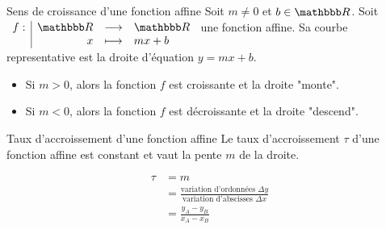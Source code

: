 \documentclass[10pt,a4paper,openany,twoside, eleve]{book}
\begin{document}
\begin{prop}{Sens de croissance d'une fonction affine}{}
  Soit $m \ne 0$ et $b\in\R$. Soit $\fonction{f}{\R}{\R}{x}{mx+b}$ une fonction affine. Sa courbe representative est la droite d'équation $y=mx+b$.

  \begin{itemize}
    \item Si $m>0$, alors la fonction $f$ est croissante et la droite "monte".
    \item Si $m<0$, alors la fonction $f$ est décroissante et la droite "descend".
  \end{itemize}
\end{prop}

\begin{prop}{Taux d'accroissement d'une fonction affine}{}
  Le taux d'accroissement $\tau$ d'une fonction affine est constant et vaut la pente $m$ de la droite.

  \begin{minipage}[t]{.5\textwidth}
    \vspace{-4.5cm}
    \begin{align*}
      \tau & = m                                                                                  \\
           & =\frac{\text{variation d'ordonnées }\Delta y}{\text{variation d'abscisses }\Delta x} \\
           & =\frac{y_A-y_B}{x_A-x_B}
    \end{align*}
  \end{minipage}
  \hfill
  \begin{minipage}[t]{.5\textwidth}
    \begin{center}
    \end{center}
  \end{minipage}

\end{prop}
\end{document}
